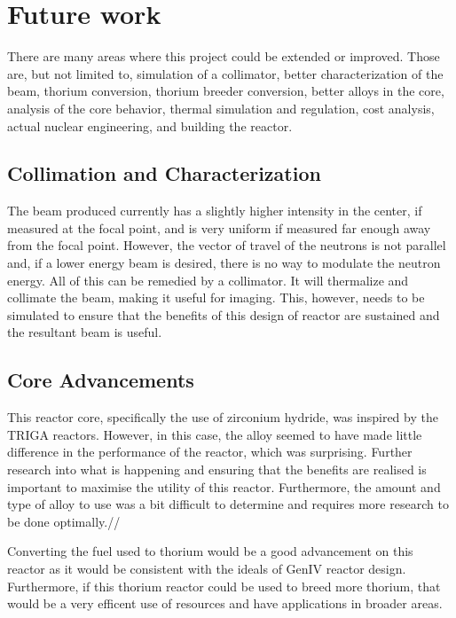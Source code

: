 \label{sec:future}
\section{Future work}

There are many areas where this project could be extended or improved. Those are, but not limited to, simulation of a collimator, better characterization of the beam, thorium conversion, thorium breeder conversion, better alloys in the core, analysis of the core behavior, thermal simulation and regulation, cost analysis, actual nuclear engineering, and building the reactor.

\subsection{Collimation and Characterization}
The beam produced currently has a slightly higher intensity in the center, if measured at the focal point, and is very uniform if measured far enough away from the focal point. However, the vector of travel of the neutrons is not parallel and, if a lower energy beam is desired, there is no way to modulate the neutron energy. All of this can be remedied by a collimator. It will thermalize and collimate the beam, making it useful for imaging. This, however, needs to be simulated to ensure that the benefits of this design of reactor are sustained and the resultant beam is useful.

\subsection{Core Advancements}
This reactor core, specifically the use of zirconium hydride, was inspired by the TRIGA reactors. However, in this case, the alloy seemed to have made little difference in the performance of the reactor, which was surprising. Further research into what is happening and ensuring that the benefits are realised is important to maximise the utility of this reactor. Furthermore, the amount and type of alloy to use was a bit difficult to determine and requires more research to be done optimally.//

Converting the fuel used to thorium would be a good advancement on this reactor as it would be consistent with the ideals of GenIV reactor design. Furthermore, if this thorium reactor could be used to breed more thorium, that would be a very efficent use of resources and have applications in broader areas.

